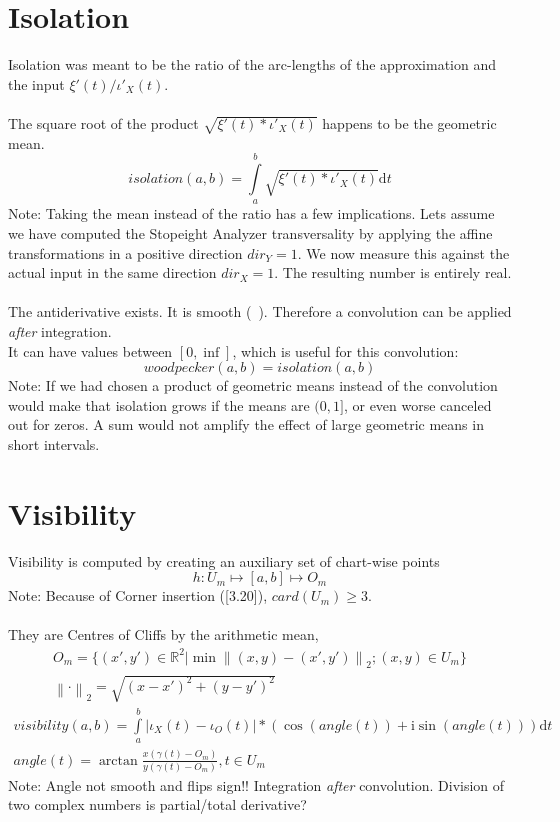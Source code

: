 \documentclass{report}
\newcommand\norm[1]{\left\lVert#1\right\rVert}
\begin{document}
\chapter{Isolation}
Isolation was meant to be the ratio of the arc-lengths of the approximation and the input $\xi'(t)/\iota'_{X}(t)$.\\\\
The square root of the product $\sqrt{\xi'(t)*\iota'_{X}(t)}$ happens to be the geometric mean.
\begin{equation}
isolation(a,b)=\int \limits _{a}^{b} \sqrt{\xi'(t)*\iota'_{X}(t)} \mathrm{d}t
\end{equation}
Note: Taking the mean instead of the ratio has a few implications. Lets assume we have computed the Stopeight Analyzer transversality by applying the affine transformations in a positive direction $dir_{Y}=1$. We now measure this against the actual input in the same direction $dir_{X}=1$. The resulting number is entirely real.\\\\
The antiderivative exists. It is smooth (~\cite[Riemann Integrable]{Widon}). Therefore a convolution can be applied \emph{after} integration.\\
It can have values between $[0,\inf]$, which is useful for this convolution:\\
\begin{equation}
woodpecker(a,b)=isolation(a,b)
\end{equation}
Note: If we had chosen a product of geometric means instead of the convolution would make that isolation grows if the means are $(0,1]$, or even worse canceled out for zeros. A sum would not amplify the effect of large geometric means in short intervals.

\chapter{Visibility}
Visibility is computed by creating an auxiliary set of chart-wise points
\begin{equation}
h: U_{m} \mapsto [a,b] \mapsto O_{m}
\end{equation}
Note: Because of Corner insertion (\cite{Stopeight}[3.20]), $card(U_{m}) \geq 3$.\\\\
They are Centres of Cliffs by the arithmetic mean,\\
\begin{align}
O_{m}=\{(x',y') \in \mathbb{R}^2 \vert \min \norm{(x,y)-(x',y')}_{2};(x,y) \in U_{m} \}\\
\norm{\cdot}_{2}=\sqrt{(x-x')^2 + (y-y')^2}
\end{align}
\begin{align}
visibility(a,b)= \int \limits _{a}^{b}\vert \iota_{X}(t)-\iota_{O}(t)\vert * (\cos(angle(t)) + \mathrm{i}\sin(angle(t))) \mathrm{d}t\\
angle(t)=\arctan\frac{x(\gamma(t)-O_{m})}{y(\gamma(t)-O_{m})},t \in U_{m}
\end{align}
Note: Angle not smooth and flips sign!! Integration \emph{after} convolution. Division of two complex numbers is partial/total derivative?
\end{document}
